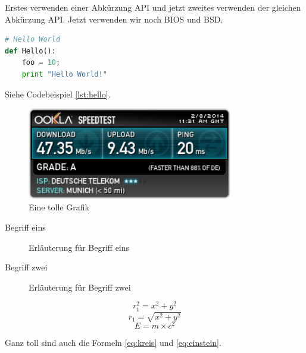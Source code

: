 \documentclass[
parskip=true,  %
fontsize=12pt, %
BCOR=12mm,     %
twoside=false  %
]{scrreprt}
\begin{document}
\blindtext\blindtext

Erstes verwenden einer Abkürzung \ac{API} und jetzt zweites verwenden der
gleichen Abkürzung \ac{API}. Jetzt verwenden wir noch \ac{BIOS} und \ac{BSD}.

\blindtext

\minipage{\linewidth} %
\begin{lstlisting}[language=python,caption={Hello World},label=lst:hello]
# Hello World
def Hello():
    foo = 10;
    print "Hello World!"
\end{lstlisting}
\endminipage

Siehe Codebeispiel \ref{lst:hello}.

\blindtext

\begin{figure}[ht]
    \centering
    \includegraphics[width=0.8\textwidth]{img/bild.png}
    \caption{Eine tolle Grafik}
    \label{abb:tollegrafik}
\end{figure}

\blindtext

\begin{description}
\item[Begriff eins] Erläuterung für Begriff eins
\item[Begriff zwei] Erläuterung für Begriff zwei
\end{description}

\blindtext

\begin{equation}
    r_1^2 = x^2 + y^2
    \label{eq:kreis}
\end{equation}
\begin{equation}
    r_1 = \sqrt{x^2 + y^2}
    \label{eq:kreis2}
\end{equation}
\begin{equation}
    E = m \times c^2
    \label{eq:einstein}
\end{equation}

Ganz toll sind auch die Formeln \ref{eq:kreis} und \ref{eq:einstein}.

\blindtext



\end{document}
